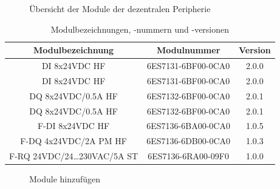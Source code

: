 \begin{figure}[H]
   \centering
   \caption[Übersicht der Module der dezentralen Peripherie]{Übersicht der Module der dezentralen Peripherie}
   \label{fig:Bild4.3}
\end{figure}

\begin{table}[H]
    \centering
    \begin{tabular}{|c|c|c|}
        \hline
         \textbf{Modulbezeichnung} & \textbf{Modulnummer} & \textbf{Version} \\
         \hline
         DI 8x24VDC HF	& 6ES7131-6BF00-0CA0	& 2.0.0 \\
         \hline
         DI 8x24VDC HF	& 6ES7131-6BF00-0CA0	& 2.0.0 \\
         \hline
         DQ 8x24VDC/0.5A HF &	6ES7132-6BF00-0CA0	& 2.0.1 \\
         \hline
         DQ 8x24VDC/0.5A HF &	6ES7132-6BF00-0CA0	& 2.0.1 \\
         \hline
         F-DI 8x24VDC HF & 	6ES7136-6BA00-0CA0	& 1.0.5 \\
         \hline
         F-DQ 4x24VDC/2A PM HF & 	6ES7136-6DB00-0CA0	& 1.0.3 \\
         \hline
         F-RQ 24VDC/24…230VAC/5A ST & 	6ES7136-6RA00-09F0	& 1.0.0 \\
         \hline
    \end{tabular}
    \caption{Modulbezeichnungen, -nummern und -versionen}
    \label{tab:Tab4.1}
\end{table}

\begin{figure}[H]
   \centering
   \caption[Module hinzufügen]{Module hinzufügen}
   \label{fig:Bild4.4}
\end{figure}

